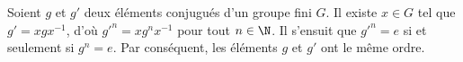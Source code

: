 Soient $g$ et $g'$ deux éléments conjugués d'un groupe fini $G$.
Il existe $x\in G$ tel que $g' = xgx^{-1}$, d'où $g'^n = xg^nx^{-1}$ pour tout $n\in\N$.
Il s'ensuit que $g'^n = e$ si et seulement si $g^n = e$.
Par conséquent, les éléments $g$ et $g'$ ont le même ordre.
